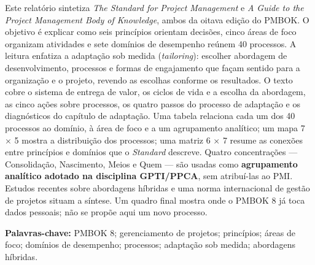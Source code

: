 \documentclass[12pt,a4paper,article,oneside,english,brazil]{abntex2}
\begin{document}
\begin{resumo}
Este relatório sintetiza \textit{The Standard for Project Management} e \textit{A Guide to the Project Management Body of Knowledge}, ambos da oitava edição do PMBOK. O objetivo é explicar como seis princípios orientam decisões, cinco áreas de foco organizam atividades e sete domínios de desempenho reúnem 40 processos. A leitura enfatiza a adaptação sob medida (\textit{tailoring}): escolher abordagem de desenvolvimento, processos e formas de engajamento que façam sentido para a organização e o projeto, revendo as escolhas conforme os resultados. O texto cobre o sistema de entrega de valor, os ciclos de vida e a escolha da abordagem, as cinco ações sobre processos, os quatro passos do processo de adaptação e os diagnósticos do capítulo de adaptação. Uma tabela relaciona cada um dos 40 processos ao domínio, à área de foco e a um agrupamento analítico; um mapa 7 \ensuremath{\times} 5 mostra a distribuição dos processos; uma matriz 6 \ensuremath{\times} 7 resume as conexões entre princípios e domínios que o \textit{Standard} descreve. Quatro concentrações — Consolidação, Nascimento, Meios e Quem — são usadas como \textbf{agrupamento analítico adotado na disciplina GPTI/PPCA}, sem atribuí-las ao PMI. Estudos recentes sobre abordagens híbridas e uma norma internacional de gestão de projetos situam a síntese. Um quadro final mostra onde o PMBOK 8 já toca dados pessoais; não se propõe aqui um novo processo.

\vspace{\onelineskip}
\noindent\textbf{Palavras-chave:} PMBOK 8; gerenciamento de projetos; princípios; áreas de foco; domínios de desempenho; processos; adaptação sob medida; abordagens híbridas.
\end{resumo}

\clearpage
\end{document}
